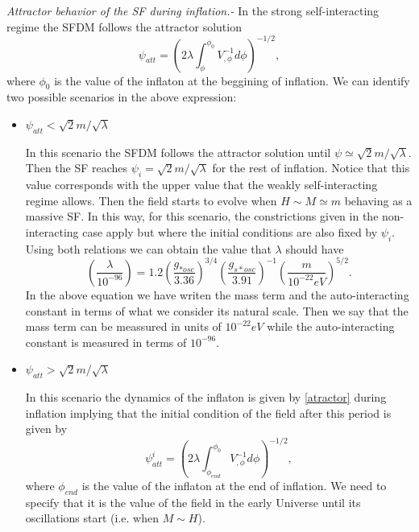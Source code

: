 \documentclass[amssymb,twocolumn,prd,nofootinbib,showpacs]{revtex4-1}
\begin{document}
\textit{Attractor behavior of the SF during inflation.-} In the strong self-interacting regime the SFDM follows the attractor solution \cite{curvatonatractor}
\begin{equation}\label{atractor}
\psi_{att} =\left(2\lambda\int_{\phi}^{\phi_0}V^{-1}_{,\phi}d\phi\right)^{-1/2},
\end{equation}
where $\phi_0$ is the value of the inflaton at the beggining of inflation. We can identify two possible scenarios in the above expression:
\begin{itemize}
\item $\psi_{att}<\sqrt{2}m/\sqrt{\lambda}$

In this scenario the SFDM follows the attractor solution until $\psi\simeq \sqrt{2}m/\sqrt{\lambda}$. Then the SF reaches $\psi_i=\sqrt{2}m/\sqrt{\lambda}$ for the rest of inflation. Notice that this value corresponds with the upper value that the weakly self-interacting regime allows. Then the field starts to evolve when $H\sim M\simeq m$ behaving as a massive SF. In this way, for this scenario, the constrictions given in the non-interacting case apply but where the initial conditions are also fixed by $\psi_i$. Using both relations we can obtain the value that $\lambda$ should have
\begin{equation}\label{wregime}
\left(\frac{\lambda}{10^{-96}}\right)=1.2\left(\frac{g_{*osc}}{3.36}\right)^{3/4}\left(\frac{g_{s*osc}}{3.91}\right)^{-1}\left(\frac{m}{10^{-22}eV}\right)^{5/2}.
\end{equation}
In the above equation we have writen the mass term and the auto-interacting constant in terms of what we consider its natural scale. Then we say that the mass term can be meassured in units of $10^{-22}eV$ while the auto-interacting constant is measured in terms of $10^{-96}$.
\\

\item $\psi_{att}>\sqrt{2}m/\sqrt{\lambda}$

In this scenario the dynamics of the inflaton is given by \eqref{atractor} during inflation implying that the initial condition of the field after this period is given by
\begin{equation}\label{atractor2}
\psi_{att}^i = \left(2\lambda\int_{\phi_{end}}^{\phi_0}V^{-1}_{,\phi}d\phi\right)^{-1/2},
\end{equation}
where $\phi_{end}$ is the value of the inflaton at the end of inflation. We need to specify that it is the value of the field in the early Universe until its oscillations start (i.e. when $M\sim H$).


\end{itemize}
\end{document}
